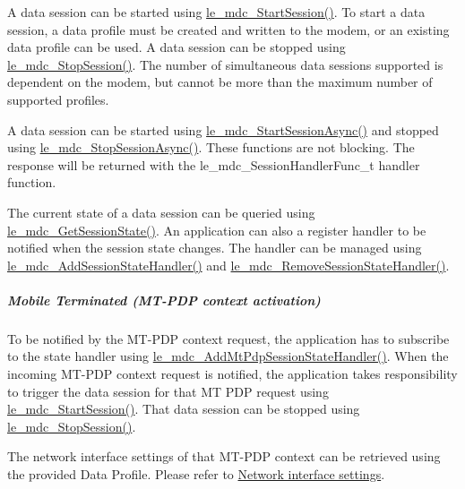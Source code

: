 A data session can be started using \hyperlink{le__mdc__interface_8h_a2cb08d5c3e6c43297d80448891719649}{le\+\_\+mdc\+\_\+\+Start\+Session()}. To start a data session, a data profile must be created and written to the modem, or an existing data profile can be used. A data session can be stopped using \hyperlink{le__mdc__interface_8h_a53453f85065c3cace0922150b7e3d869}{le\+\_\+mdc\+\_\+\+Stop\+Session()}. The number of simultaneous data sessions supported is dependent on the modem, but cannot be more than the maximum number of supported profiles.

A data session can be started using \hyperlink{le__mdc__interface_8h_aa03d6e31263ddf8bf1d94b183c9934d9}{le\+\_\+mdc\+\_\+\+Start\+Session\+Async()} and stopped using \hyperlink{le__mdc__interface_8h_ac5b357f7437c9e253fa17b2511fa14ef}{le\+\_\+mdc\+\_\+\+Stop\+Session\+Async()}. These functions are not blocking. The response will be returned with the {\ttfamily le\+\_\+mdc\+\_\+\+Session\+Handler\+Func\+\_\+t} handler function.

The current state of a data session can be queried using \hyperlink{le__mdc__interface_8h_add91c364e8b3e4e82a0ce64e480c016b}{le\+\_\+mdc\+\_\+\+Get\+Session\+State()}. An application can also a register handler to be notified when the session state changes. The handler can be managed using \hyperlink{le__mdc__interface_8h_a594c85c1ccb56ddfbaf36496f35f681e}{le\+\_\+mdc\+\_\+\+Add\+Session\+State\+Handler()} and \hyperlink{le__mdc__interface_8h_af223a193b73ce6f870947557f69136dc}{le\+\_\+mdc\+\_\+\+Remove\+Session\+State\+Handler()}.\hypertarget{c_mdc_le_mdc_session_MT}{}\subparagraph{Mobile Terminated (\+M\+T-\/\+P\+D\+P context activation)}\label{c_mdc_le_mdc_session_MT}
To be notified by the M\+T-\/\+P\+DP context request, the application has to subscribe to the state handler using \hyperlink{le__mdc__interface_8h_ada19c2a399ba8c0aa038e27c21689472}{le\+\_\+mdc\+\_\+\+Add\+Mt\+Pdp\+Session\+State\+Handler()}. When the incoming M\+T-\/\+P\+DP context request is notified, the application takes responsibility to trigger the data session for that MT P\+DP request using \hyperlink{le__mdc__interface_8h_a2cb08d5c3e6c43297d80448891719649}{le\+\_\+mdc\+\_\+\+Start\+Session()}. That data session can be stopped using \hyperlink{le__mdc__interface_8h_a53453f85065c3cace0922150b7e3d869}{le\+\_\+mdc\+\_\+\+Stop\+Session()}.

The network interface settings of that M\+T-\/\+P\+DP context can be retrieved using the provided Data Profile. Please refer to \hyperlink{c_mdc_le_mdc_session_networkItf}{Network interface settings}.

